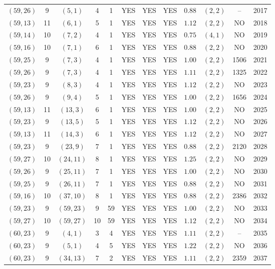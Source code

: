 \begin{longtable}{|c|c|c|c|c|c|c|c|c|c|c|c|}
$(59,26)$ & 9 & $(5,1)$ & 4 & 1 & YES & YES & YES & $0.88$ & $(2,2)$ & -- & 2017\\
$(59,13)$ & 11 & $(6,1)$ & 5 & 1 & YES & YES & YES & $1.12$ & $(2,2)$ & NO & 2018\\
$(59,14)$ & 10 & $(7,2)$ & 4 & 1 & YES & YES & YES & $0.75$ & $(4,1)$ & NO & 2019\\
$(59,16)$ & 10 & $(7,1)$ & 6 & 1 & YES & YES & YES & $0.88$ & $(2,2)$ & NO & 2020\\
$(59,25)$ & 9 & $(7,3)$ & 4 & 1 & YES & YES & YES & $1.00$ & $(2,2)$ & 1506 & 2021\\
$(59,26)$ & 9 & $(7,3)$ & 4 & 1 & YES & YES & YES & $1.11$ & $(2,2)$ & 1325 & 2022\\
$(59,23)$ & 9 & $(8,3)$ & 4 & 1 & YES & YES & YES & $1.12$ & $(2,2)$ & NO & 2023\\
$(59,26)$ & 9 & $(9,4)$ & 5 & 1 & YES & YES & YES & $1.00$ & $(2,2)$ & 1656 & 2024\\
$(59,13)$ & 11 & $(13,3)$ & 6 & 1 & YES & YES & YES & $1.00$ & $(2,2)$ & NO & 2025\\
$(59,23)$ & 9 & $(13,5)$ & 5 & 1 & YES & YES & YES & $1.12$ & $(2,2)$ & NO & 2026\\
$(59,13)$ & 11 & $(14,3)$ & 6 & 1 & YES & YES & YES & $1.12$ & $(2,2)$ & NO & 2027\\
$(59,23)$ & 9 & $(23,9)$ & 7 & 1 & YES & YES & YES & $0.88$ & $(2,2)$ & 2120 & 2028\\
$(59,27)$ & 10 & $(24,11)$ & 8 & 1 & YES & YES & YES & $1.25$ & $(2,2)$ & NO & 2029\\
$(59,26)$ & 9 & $(25,11)$ & 7 & 1 & YES & YES & YES & $1.00$ & $(2,2)$ & NO & 2030\\
$(59,25)$ & 9 & $(26,11)$ & 7 & 1 & YES & YES & YES & $0.88$ & $(2,2)$ & NO & 2031\\
$(59,16)$ & 10 & $(37,10)$ & 8 & 1 & YES & YES & YES & $0.88$ & $(2,2)$ & 2386 & 2032\\
$(59,23)$ & 9 & $(59,23)$ & 9 & 59 & YES & YES & YES & $1.00$ & $(2,2)$ & NO & 2033\\
$(59,27)$ & 10 & $(59,27)$ & 10 & 59 & YES & YES & YES & $1.12$ & $(2,2)$ & NO & 2034\\
$(60,23)$ & 9 & $(4,1)$ & 3 & 4 & YES & YES & YES & $1.11$ & $(2,2)$ & -- & 2035\\
$(60,23)$ & 9 & $(5,1)$ & 4 & 5 & YES & YES & YES & $1.22$ & $(2,2)$ & NO & 2036\\
$(60,23)$ & 9 & $(34,13)$ & 7 & 2 & YES & YES & YES & $1.11$ & $(2,2)$ & 2359 & 2037\\

\end{longtable}
